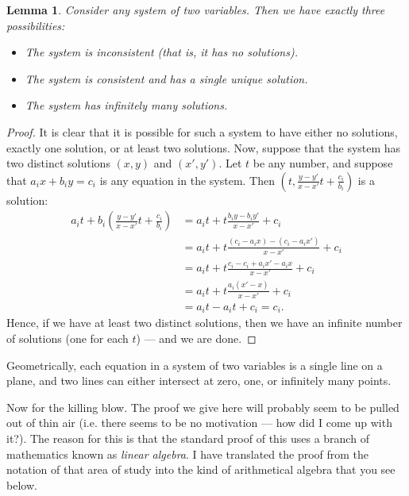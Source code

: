 \documentclass[a4paper,leqno]{article}
\numberwithin{equation}{section}
\newtheorem{lem}[equation]{Lemma}
\theoremstyle{definition}
\theoremstyle{remark}
\begin{document}
\begin{lem}
  Consider any system of two variables. Then we have exactly three possibilities:
  \begin{itemize}
    \item The system is inconsistent (that is, it has no solutions).
    \item The system is consistent and has a single unique solution.
    \item The system has infinitely many solutions.
  \end{itemize}
\end{lem}
\begin{proof}
  It is clear that it is possible for such a system to have either no solutions, exactly one solution, or at least two solutions. Now,
  suppose that the system has two distinct solutions $ (x,y) $ and $ (x',y') $. Let $ t $ be any number, and suppose that $ a_i x + b_i y = c_i $ is any equation
  in the system. Then $ \left(t, \frac{y - y'}{x - x'} t + \frac{c_i}{b_i}\right) $ is a solution:
  \begin{align*}
    a_i t + b_i \left(\frac{y - y'}{x - x'} t + \frac{c_i}{b_i}\right) &= a_i t + t\frac{b_i y - b_i y'}{x - x'} + c_i\\
                                                                       &= a_i t + t\frac{(c_i - a_i x) - (c_i - a_i x')}{x - x'} + c_i\\
                                                                       &= a_i t + t\frac{c_i - c_i + a_i x' - a_i x}{x - x'} + c_i\\
                                                                       &= a_i t + t\frac{a_i(x' - x)}{x - x'} + c_i\\
                                                                       &= a_i t - a_i t + c_i = c_i.
  \end{align*}
  Hence, if we have at least two distinct solutions, then we have an infinite number of solutions (one for each $ t $) --- and we are done.
\end{proof}

Geometrically, each equation in a system of two variables is a single line on a plane, and two lines can either intersect at zero, one, or infinitely
many points.

Now for the killing blow. The proof we give here will probably seem to be pulled out of thin air (i.e. there seems to be no motivation --- how
did I come up with it?). The reason for this is that the standard proof of this uses a branch of mathematics known as \emph{linear algebra}. I
have translated the proof from the notation of that area of study into the kind of arithmetical algebra that you see below.
\end{document}
